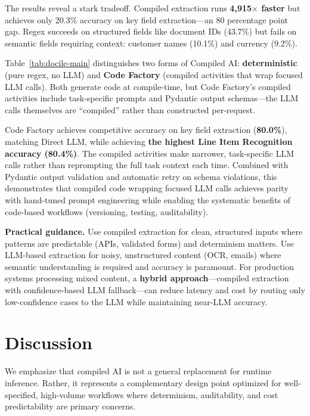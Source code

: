 \documentclass[11pt]{article}
\begin{document}
The results reveal a stark tradeoff. Compiled extraction runs \textbf{4,915$\times$ faster} but achieves only 20.3\% accuracy on key field extraction---an 80 percentage point gap. Regex succeeds on structured fields like document IDs (43.7\%) but fails on semantic fields requiring context: customer names (10.1\%) and currency (9.2\%).

Table~\ref{tab:docile-main} distinguishes two forms of Compiled AI: \textbf{deterministic} (pure regex, no LLM) and \textbf{Code Factory} (compiled activities that wrap focused LLM calls). Both generate code at compile-time, but Code Factory's compiled activities include task-specific prompts and Pydantic output schemas---the LLM calls themselves are ``compiled'' rather than constructed per-request.

Code Factory achieves competitive accuracy on key field extraction (\textbf{80.0\%}), matching Direct LLM, while achieving \textbf{the highest Line Item Recognition accuracy (80.4\%)}. The compiled activities make narrower, task-specific LLM calls rather than reprompting the full task context each time. Combined with Pydantic output validation and automatic retry on schema violations, this demonstrates that compiled code wrapping focused LLM calls achieves parity with hand-tuned prompt engineering while enabling the systematic benefits of code-based workflows (versioning, testing, auditability).

\textbf{Practical guidance.} Use compiled extraction for clean, structured inputs where patterns are predictable (APIs, validated forms) and determinism matters. Use LLM-based extraction for noisy, unstructured content (OCR, emails) where semantic understanding is required and accuracy is paramount. For production systems processing mixed content, a \textbf{hybrid approach}---compiled extraction with confidence-based LLM fallback---can reduce latency and cost by routing only low-confidence cases to the LLM while maintaining near-LLM accuracy.

\section{Discussion}
\label{sec:discussion}

We emphasize that compiled AI is not a general replacement for runtime inference. Rather, it represents a complementary design point optimized for well-specified, high-volume workflows where determinism, auditability, and cost predictability are primary concerns.
\end{document}

